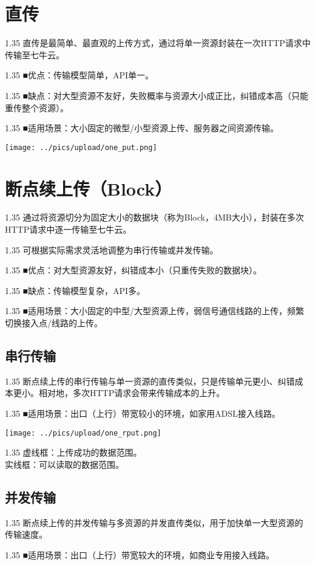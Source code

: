 \documentclass[11pt, oneside]{book}
\newcommand{\qpara}[1]{
\vspace{0.4em}
\begin{spacing}{1.35}
\noindent
#1\par
\end{spacing}
\vspace{0.4em}
}
\begin{document}
\section{直传}

\qpara{直传是最简单、最直观的上传方式，通过将单一资源封装在一次HTTP请求中传输至七牛云。}
\qpara{■\thinspace 优点：传输模型简单，API单一。}
\qpara{■\thinspace 缺点：对大型资源不友好，失败概率与资源大小成正比，纠错成本高（只能重传整个资源）。}
\qpara{■\thinspace 适用场景：大小固定的微型/小型资源上传、服务器之间资源传输。}

\begin{center}
\texttt{[image: ../pics/upload/one\_put.png]}
\end{center}

\section{断点续上传（Block）}

\qpara{通过将资源切分为固定大小的数据块（称为Block，4MB大小），封装在多次HTTP请求中逐一传输至七牛云。}
\qpara{可根据实际需求灵活地调整为串行传输或并发传输。}
\qpara{■\thinspace 优点：对大型资源友好，纠错成本小（只重传失败的数据块）。}
\qpara{■\thinspace 缺点：传输模型复杂，API多。}
\qpara{■\thinspace 适用场景：大小固定的中型/大型资源上传，弱信号通信线路的上传，频繁切换接入点/线路的上传。}

\subsection{串行传输}

\qpara{断点续上传的串行传输与单一资源的直传类似，只是传输单元更小、纠错成本更小。相对地，多次HTTP请求会带来传输成本的上升。}
\qpara{■\thinspace 适用场景：出口（上行）带宽较小的环境，如家用ADSL接入线路。}

\begin{center}
\texttt{[image: ../pics/upload/one\_rput.png]}
\end{center}

\qpara{虚线框：上传成功的数据范围。 \\ 实线框：可以读取的数据范围。}

\subsection{并发传输}

\qpara{断点续上传的并发传输与多资源的并发直传类似，用于加快单一大型资源的传输速度。}
\qpara{■\thinspace 适用场景：出口（上行）带宽较大的环境，如商业专用接入线路。}
\end{document}
